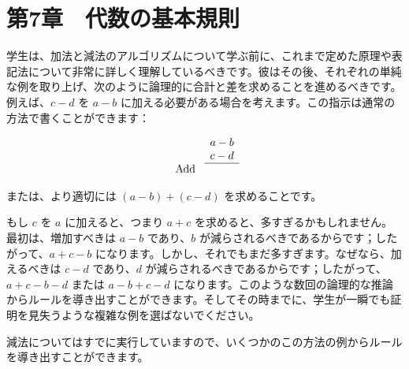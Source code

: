 \documentclass[a4paper,11pt,openany]{ltjsbook}
\newcommand{\Strut}[1][1em]{\rule[-0.3#1]{0pt}{#1}}
\begin{document}
\chapter{第7章　代数の基本規則}

学生は、加法と減法のアルゴリズムについて学ぶ前に、これまで定めた原理や表記法について非常に詳しく理解しているべきです。彼はその後、それぞれの単純な例を取り上げ、次のように論理的に合計と差を求めることを進めるべきです。例えば、$c - d$ を $a - b$ に加える必要がある場合を考えます。この指示は通常の方法で書くことができます：

\[
\begin{array}{rc}
    & a - b \\
    & c - d \\
\cline{2-2}
\Strut\text{Add }
\end{array}
\]

または、より適切には $(a - b) + (c - d)$ を求めることです。

もし $c$ を $a$ に加えると、つまり $a + c$ を求めると、多すぎるかもしれません。最初は、増加すべきは $a - b$ であり、$b$ が減らされるべきであるからです；したがって、$a + c - b$ になります。しかし、それでもまだ多すぎます。なぜなら、加えるべきは $c - d$ であり、$d$ が減らされるべきであるからです；したがって、$a + c - b - d$ または $a - b + c - d$ になります。このような数回の論理的な推論からルールを導き出すことができます。そしてその時までに、学生が一瞬でも証明を見失うような複雑な例を選ばないでください。

減法についてはすでに実行していますので、いくつかのこの方法の例からルールを導き出すことができます。
\end{document}
